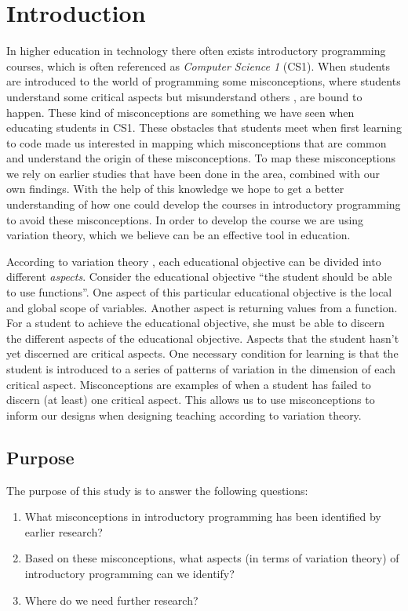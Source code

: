 \section{Introduction}


In higher education in technology there often exists introductory 
programming courses, which is often referenced as \emph{Computer Science 1} 
(CS1). When students are introduced to the world of programming some
misconceptions, where students understand some critical aspects but 
misunderstand others \parencite{NCOL}, are bound to happen. These kind of 
misconceptions are something we have seen when educating students in CS1. 
These obstacles that students meet when first learning to code made us 
interested in mapping which misconceptions that are common and understand 
the origin of these misconceptions. To map these misconceptions we rely on 
earlier studies that have been done in the area, combined with our own 
findings. With the help of this knowledge we hope to get a better 
understanding of how one  could develop the courses in introductory 
programming to avoid these  misconceptions. In order to develop the course 
we are using variation theory, which we believe can be an effective tool in 
education. 

According to variation theory \parencite[Ch.~2]{NCOL}, each educational 
objective can be divided into different \emph{aspects}.
Consider the educational objective \enquote{the student should be able to 
use 
functions}.
One aspect of this particular educational objective is the local and global 
scope 
of variables.
Another aspect is returning values from a function.
For a student to achieve the educational objective, she must be able to 
discern 
the different aspects of the educational objective.
Aspects that the student hasn't yet discerned are critical aspects.
One necessary condition for learning is that the student is introduced to a 
series of patterns of variation in the dimension of each critical aspect.
Misconceptions are examples of when a student has failed to discern (at 
least) 
one critical aspect.
This allows us to use misconceptions to inform our designs when designing 
teaching according to variation theory.

\subsection{Purpose}

The purpose of this study is to answer the following questions:
\begin{enumerate}
  \item What misconceptions in introductory programming has been identified 
by 
    earlier research?
  \item Based on these misconceptions, what aspects (in terms of variation 
    theory) of introductory programming can we identify?
  \item Where do we need further research?
\end{enumerate}